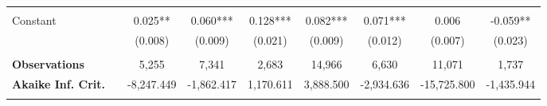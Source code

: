 \begin{tabular*}{0.95\textwidth}{@{\extracolsep{\fill} } llccccccc}
\arrayrulecolor{white}%
\hline%
\arrayrulecolor{white}%
\hline%
\arrayrulecolor{white}%
\hline%
\arrayrulecolor{white}%
\hline%
\arrayrulecolor{white}%
\hline%
&&&&&&&&\\%
\multirow{2}{*}{Constant}&&0.025**&0.060***&0.128***&0.082***&0.071***&0.006&{-}0.059**\\%
&&(0.008)&(0.009)&(0.021)&(0.009)&(0.012)&(0.007)&(0.023)\\%
\arrayrulecolor{white}%
\hline%
\arrayrulecolor{white}%
\hline%
\arrayrulecolor{white}%
\hline%
\arrayrulecolor{white}%
\hline%
\arrayrulecolor{white}%
\hline%
&&&&&&&&\\%
\bfseries Observations&&5,255&7,341&2,683&14,966&6,630&11,071&1,737\\%
\bfseries Akaike Inf. Crit.&&{-}8,247.449&{-}1,862.417&1,170.611&3,888.500&{-}2,934.636&{-}15,725.800&{-}1,435.944\\%
\arrayrulecolor{white}%
\hline%
\arrayrulecolor{white}%
\hline%
\arrayrulecolor{white}%
\hline%
\arrayrulecolor{white}%
\hline%
\arrayrulecolor{white}%
\hline%
\arrayrulecolor{black}%
\hline%
\end{tabular*}